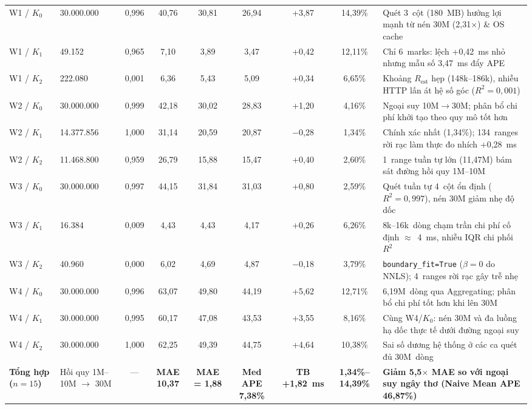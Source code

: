 \documentclass[13pt,a4paper]{report}
\begin{document}
\begin{table}[!htb]
{\begin{tabular}{llccccccp{5.8cm}}
\midrule
W1 / $K_0$ & 30.000.000 & 0,996 & 40,76 & 30,81 & 26,94 & +3,87 & 14,39\% & Quét 3~cột (180~MB) hưởng lợi mạnh từ nén 30M (2,31${\times}$) \& OS cache \\
W1 / $K_1$ & 49.152 & 0,965 & 7,10 & 3,89 & 3,47 & +0,42 & 12,11\% & Chỉ 6~marks: lệch +0,42~ms nhỏ nhưng mẫu số 3,47~ms đẩy APE \\
W1 / $K_2$ & 222.080 & 0,001 & 6,36 & 5,43 & 5,09 & +0,34 & 6,65\% & Khoảng $R_{\text{est}}$ hẹp (148k--186k), nhiễu HTTP lấn át hệ số góc ($R^2 = 0{,}001$) \\
\midrule
W2 / $K_0$ & 30.000.000 & 0,999 & 42,18 & 30,02 & 28,83 & +1,20 & 4,16\% & Ngoại suy 10M$\rightarrow$30M; phân bổ chi phí khởi tạo theo quy mô tốt hơn \\
W2 / $K_1$ & 14.377.856 & 1,000 & 31,14 & 20,59 & 20,87 & $-$0,28 & 1,34\% & Chính xác nhất (1,34\%); 134~ranges rời rạc làm thực đo nhích +0,28~ms \\
W2 / $K_2$ & 11.468.800 & 0,959 & 26,79 & 15,88 & 15,47 & +0,40 & 2,60\% & 1~range tuần tự lớn (11,47M) bám sát đường hồi quy 1M--10M \\
\midrule
W3 / $K_0$ & 30.000.000 & 0,997 & 44,15 & 31,84 & 31,03 & +0,80 & 2,59\% & Quét tuần tự 4~cột ổn định ($R^2 = 0{,}997$), nén 30M giảm nhẹ độ dốc \\
W3 / $K_1$ & 16.384 & 0,009 & 4,43 & 4,43 & 4,17 & +0,26 & 6,26\% & 8k--16k~dòng chạm trần chi phí cố định $\approx$~4~ms, nhiễu IQR chi phối $R^2$ \\
W3 / $K_2$ & 40.960 & 0,000 & 6,02 & 4,69 & 4,87 & $-$0,18 & 3,79\% & \texttt{boundary\_\allowbreak{}fit=True} ($\beta = 0$ do NNLS); 4~ranges rời rạc gây trễ nhẹ \\
\midrule
W4 / $K_0$ & 30.000.000 & 0,996 & 63,07 & 49,80 & 44,19 & +5,62 & 12,71\% & 6,19M~dòng qua Aggregating; phân bổ chi phí tốt hơn khi lên 30M \\
W4 / $K_1$ & 30.000.000 & 0,995 & 60,17 & 47,08 & 43,53 & +3,55 & 8,16\% & Cùng W4/$K_0$: nén 30M và đa luồng hạ dốc thực tế dưới đường ngoại suy \\
W4 / $K_2$ & 30.000.000 & 1,000 & 62,25 & 49,39 & 44,75 & +4,64 & 10,38\% & Sai số dương hệ thống ở các ca quét đủ 30M~dòng \\
\midrule
\textbf{Tổng hợp ($n=15$)} & Hồi quy 1M--10M $\rightarrow$ 30M & --- & \textbf{MAE 10,37} & \textbf{MAE = 1,88} & \textbf{Med APE 7,38\%} & \textbf{TB +1,82~ms} & \textbf{1,34\%--14,39\%} & \textbf{Giảm 5,5${\times}$ MAE so với ngoại suy ngây thơ (Naive Mean APE 46,87\%)} \\
\bottomrule
\end{tabular}%
}
\end{table}
\end{document}
